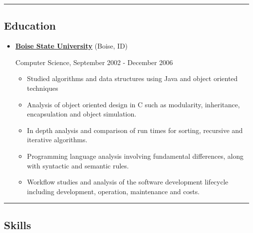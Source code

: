 \documentclass{article}
\begin{document}
\vspace{.5em} \hrule \vspace{.5em}
\hypertarget{education}{}\subsection*{{Education}}\label{education}

\begin{itemize}%
\item \textbf{\href{http://boisestate.edu}{Boise State University}} (Boise, ID)

Computer Science, September 2002 - December 2006

\begin{itemize}%
\item Studied algorithms and data structures using Java and object oriented techniques
\item Analysis of object oriented design in C such as modularity, inheritance, encapsulation and object simulation.
\item In depth analysis and comparison of run times for sorting, recursive and iterative algorithms.
\item Programming language analysis involving fundamental differences, along with syntactic and semantic rules.
\item Workflow studies and analysis of the software development lifecycle including development, operation, maintenance and costs.

\end{itemize}


\end{itemize}

\vspace{.5em} \hrule \vspace{.5em}
\hypertarget{skills}{}\subsection*{{Skills}}\label{skills}
\end{document}
